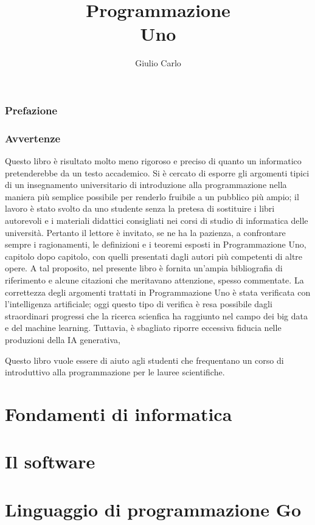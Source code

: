 \documentclass[12pt,a4paper,titlepage]{book}
\author{Giulio Carlo}
\date{}
\title{\huge{\textbf{Programmazione}} \\
\vspace{0.5cm}
\huge{\textbf{Uno}}}
\numberwithin{theorem}{section}
\theoremstyle{numparens}
\theoremstyle{break}
\begin{document}
\maketitle
\frontmatter
\section*{Prefazione}
\newpage
\section*{Avvertenze}
Questo libro è risultato molto meno rigoroso e preciso di quanto un informatico
pretenderebbe da un testo accademico. Si è cercato di esporre gli argomenti
tipici di un insegnamento universitario di introduzione alla programmazione 
nella maniera più semplice possibile per renderlo fruibile a un pubblico più
ampio; il lavoro è stato svolto da uno studente senza la pretesa di sostituire
i libri autorevoli e i materiali didattici consigliati nei corsi di studio di
informatica delle università. 
Pertanto il lettore è invitato, se ne ha la pazienza, a confrontare sempre i
ragionamenti, le definizioni e i teoremi esposti in Programmazione Uno, capitolo
dopo capitolo, con quelli presentati dagli autori più competenti di altre opere.
A tal proposito, nel presente libro è fornita un'ampia bibliografia di
riferimento e alcune citazioni che meritavano attenzione, spesso commentate.
La correttezza degli argomenti trattati in Programmazione Uno è stata verificata
con l'intelligenza artificiale; oggi questo tipo di verifica è resa possibile
dagli straordinari progressi che la ricerca scienfica ha raggiunto nel campo dei
big data e del machine learning. Tuttavia, è sbagliato riporre eccessiva fiducia
nelle produzioni della IA generativa, 


Questo libro vuole essere di aiuto agli studenti che frequentano un corso di
introduttivo alla programmazione per le lauree scientifiche.
\newpage
\setcounter{tocdepth}{1}
\tableofcontents
\mainmatter
\part{Fondamenti di informatica}



\part{Il software}

\part{Linguaggio di programmazione Go}





\appendix

\printbibliography[heading=bibintoc]
\end{document}
